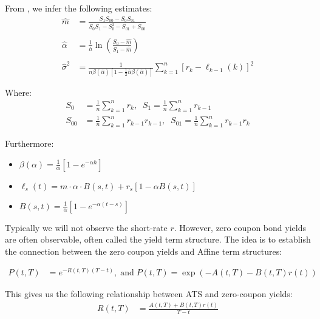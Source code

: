 \newpage
From \cite{fergusson2015application}, we infer the following estimates: 
\begin{align*}
\hat{m} &= \frac{
S_{1}S_{00}-S_{0}S_{01}
}{
S_{0}S_{1}-S_{0}^{2}-S_{01} + S_{00}
}\\
\\ 
\hat{\alpha} &= \frac{1}{h}\ln\left(
\frac{S_{0}-\hat{m}}{S_{1}-\hat{m}}
\right) \\ 
\\ 
\hat{\sigma}^{2} &= 
\frac{
1}{
n\beta(\hat{\alpha})[1-\frac{1}{2}\hat{\alpha}\beta(\hat{\alpha})]
}
\sum_{k=1}^{n}[
r_{k}-\ell_{k-1}(k)
]^{2}
\end{align*}

Where:
\begin{align*}
S_{0} &= \frac{1}{n}\sum_{k=1}^{n}r_{k}, \;\; 
S_{1} = \frac{1}{n}\sum_{k=1}^{n}r_{k-1} \\ 
S_{00} &= \frac{1}{n}\sum_{k=1}^{n}r_{k-1}r_{k-1}, \;\; 
S_{01} = \frac{1}{n}\sum_{k=1}^{n}r_{k-1}r_{k}
\end{align*}

Furthermore: 
\begin{itemize}[leftmargin =*]
    \item $\beta(\alpha) =\frac{1}{\alpha}\left[
    1 - e^{-\alpha h}
    \right]$ 
    \item $\ell_{s}(t) = m\cdot\alpha\cdot B(s,t) + r_{s}[1-\alpha B(s,t)] $ 
    \item $B(s,t) = \frac{1}{\alpha}\left[
    1-e^{-\alpha(t-s)}\right]$
\end{itemize}

Typically we will not observe the short-rate $r$. However, zero coupon bond yields are often observable, often called the yield term structure. The idea is to establish the connection between the zero coupon yields and Affine term structures:

\begin{align*}
P(t,T) &= e^{-R(t,T)(T-t)}, \;\text{and}\;
P(t,T) = \exp\left(
-A(t,T) -B(t,T)r(t)
\right)
\end{align*}

This gives us the following relationship between ATS and zero-coupon yields: 
\begin{align*}
R(t,T) &= \frac{
A(t,T) + B(t,T)r(t)
}{
T-t
}    
\end{align*}













